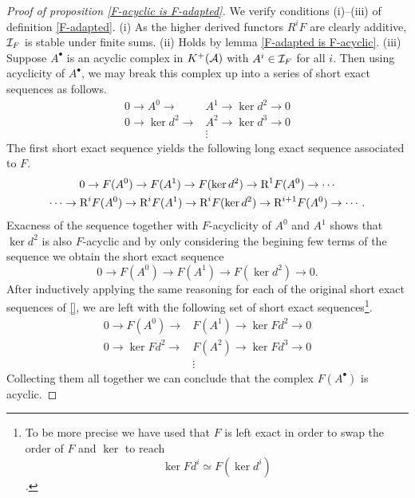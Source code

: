\begin{proof}[Proof of proposition \ref{F-acyclic is F-adapted}]
    We verify conditions (i)--(iii) of definition \ref{F-adapted}. (i) As the higher derived functors $R^iF$ are clearly additive, $\mathcal I_F$ is stable under finite sums. (ii) Holds by lemma \ref{F-adapted is F-acyclic}. (iii) Suppose $A^\bullet$ is an acyclic complex in $K^+(\mathcal A)$ with $A^i \in \mathcal I_F$ for all $i$. Then using acyclicity of $A^\bullet$, we may break this complex up into a series of short exact sequences as follows.
    \begin{align*}
        0 \to A^0 \to & A^1 \to \ker d^2 \to 0 \\
        0 \to \ker d^2 \to & A^2 \to \ker d^3 \to 0 \\
        & \vdots
    \end{align*} 
    The first short exact sequence yields the following long exact sequence associated to $F$.
    \begin{multline*}
        0 \to F(A^0) \to F(A^1) \to F(\ker d^2) \to \text{R}^{1}F(A^0) \to \cdots \\ \cdots \to \text{R}^{i}F(A^0) \to \text{R}^{i}F(A^1) \to \text{R}^{i}F(\ker d^2) \to \text{R}^{i+1}F(A^0) \to \cdots.
    \end{multline*}
    Exacness of the sequence together with $F$-acyclicity of $A^0$ and $A^1$ shows that $\ker d^2$ is also $F$-acyclic and by only considering the begining few terms of the sequence we obtain the  short exact sequence 
    \[
        0 \to F(A^0) \to F(A^1) \to F(\ker d^2) \to 0.
    \]
    After inductively applying the same reasoning for each of the original short exact sequences of \eqref{}, we are left with the following set of short exact sequences\footnote{To be more precise we have used that $F$ is left exact in order to swap the order of $F$ and $\ker$ to reach \[\ker Fd^i \simeq F(\ker d^i)\].}.
    \begin{align*}
        0 \to F(A^0) \to & F(A^1) \to \ker Fd^2 \to 0 \\
        0 \to \ker Fd^2 \to & F(A^2) \to \ker Fd^3 \to 0 \\
        & \vdots
    \end{align*}   
    Collecting them all together we can conclude that the complex $F(A^\bullet)$ is acyclic.\qedhere
\end{proof}
